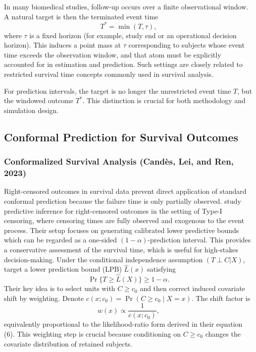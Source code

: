 \documentclass[12pt]{article}
\makeatletter
\let\thesis@section\subsection
\let\thesis@subsection\subsubsection
\renewcommand{\section}{\thesis@section}
\renewcommand{\subsection}{\thesis@subsection}
\makeatother
\begin{document}
In many biomedical studies, follow-up occurs over a finite observational window.
A natural target is then the terminated event time
\[
T^*=\min(T,\tau),
\]
where $\tau$ is a fixed horizon (for example, study end or an operational decision horizon). 
This induces a point mass at $\tau$ corresponding to subjects whose event time exceeds the observation window, and that atom must be explicitly accounted for in estimation and prediction. Such settings are closely related to restricted survival time concepts commonly used in survival analysis. \citep{royston2013restricted, uno2014moving}

For prediction intervals, the target is no longer the unrestricted event time $T$, but the windowed outcome $T^*$.
This distinction is crucial for both methodology and simulation design.


\section{Conformal Prediction for Survival Outcomes}
\subsection{Conformalized Survival Analysis (Cand\`es, Lei, and Ren, 2023)}
Right-censored outcomes in survival data prevent direct application of standard conformal prediction because the failure time is only partially observed. \citet{candes2023conformalized} study predictive inference for right-censored outcomes in the setting of Type-I censoring, where censoring times are fully observed and
exogenous to the event process.
Their setup focuses on generating calibrated lower predictive bounds which can be regarded as a one-sided $(1-\alpha)$-prediction interval. This provides a conservative assessment of the survival time, which is useful for high-stakes decision-making.
Under the conditional independence assumption $(T\perp C|X)$, \citet{candes2023conformalized} target a lower prediction bound (LPB) $\widehat L(x)$ satisfying
\[
\Pr\{T\ge \widehat L(X)\}\ge 1-\alpha.
\]
Their key idea is to select units with $C\ge c_0$ and then correct induced covariate shift by weighting.
Denote $c(x;c_0)=\Pr(C\ge c_0\mid X=x)$. The shift factor is
\[
w(x)\propto \frac{1}{c(x;c_0)},
\]
equivalently proportional to the likelihood-ratio form derived in their equation (6).
This weighting step is crucial because conditioning on $C\ge c_0$ changes the covariate distribution of retained subjects.
\end{document}
